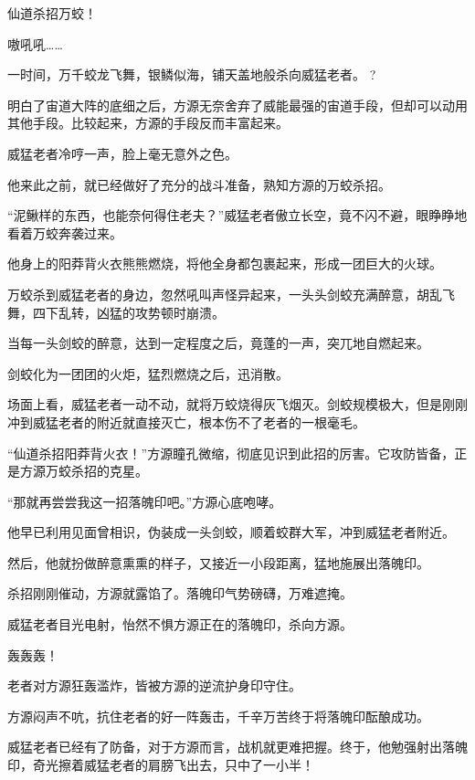 
\begin{this_body}



仙道杀招万蛟！

嗷吼吼……

一时间，万千蛟龙飞舞，银鳞似海，铺天盖地般杀向威猛老者。 ?

明白了宙道大阵的底细之后，方源无奈舍弃了威能最强的宙道手段，但却可以动用其他手段。比较起来，方源的手段反而丰富起来。

威猛老者冷哼一声，脸上毫无意外之色。

他来此之前，就已经做好了充分的战斗准备，熟知方源的万蛟杀招。

“泥鳅样的东西，也能奈何得住老夫？”威猛老者傲立长空，竟不闪不避，眼睁睁地看着万蛟奔袭过来。

他身上的阳莽背火衣熊熊燃烧，将他全身都包裹起来，形成一团巨大的火球。

万蛟杀到威猛老者的身边，忽然吼叫声怪异起来，一头头剑蛟充满醉意，胡乱飞舞，四下乱转，凶猛的攻势顿时崩溃。

当每一头剑蛟的醉意，达到一定程度之后，竟蓬的一声，突兀地自燃起来。

剑蛟化为一团团的火炬，猛烈燃烧之后，迅消散。

场面上看，威猛老者一动不动，就将万蛟烧得灰飞烟灭。剑蛟规模极大，但是刚刚冲到威猛老者的附近就直接灭亡，根本伤不了老者的一根毫毛。

“仙道杀招阳莽背火衣！”方源瞳孔微缩，彻底见识到此招的厉害。它攻防皆备，正是方源万蛟杀招的克星。

“那就再尝尝我这一招落魄印吧。”方源心底咆哮。

他早已利用见面曾相识，伪装成一头剑蛟，顺着蛟群大军，冲到威猛老者附近。

然后，他就扮做醉意熏熏的样子，又接近一小段距离，猛地施展出落魄印。

杀招刚刚催动，方源就露馅了。落魄印气势磅礴，万难遮掩。

威猛老者目光电射，怡然不惧方源正在的落魄印，杀向方源。

轰轰轰！

老者对方源狂轰滥炸，皆被方源的逆流护身印守住。

方源闷声不吭，抗住老者的好一阵轰击，千辛万苦终于将落魄印酝酿成功。

威猛老者已经有了防备，对于方源而言，战机就更难把握。终于，他勉强射出落魄印，奇光擦着威猛老者的肩膀飞出去，只中了一小半！


\end{this_body}
